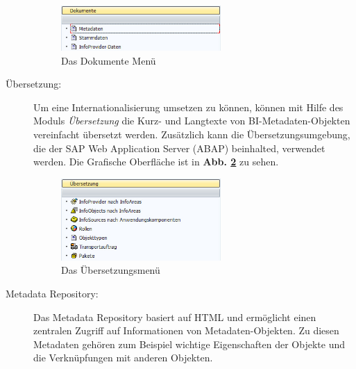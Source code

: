 \begin{description}
\begin{figure}[H]
    \centering
    \includegraphics[width=0.6\textwidth]{files/Dokumente}
    \caption{Das Dokumente Menü}
    \label{pic:Dokumente}
\end{figure}
\item[Übersetzung:] Um eine Internationalisierung umsetzen zu können, können mit Hilfe des Moduls \textit{Übersetzung} die Kurz- und Langtexte von BI-Metadaten-Objekten vereinfacht übersetzt werden. Zusätzlich kann die Übersetzungsumgebung, die der SAP Web Application Server (ABAP) beinhalted, verwendet werden.
Die Grafische Oberfläche ist in \textbf{Abb. \ref{pic:Uebersetzung}} zu sehen.
\begin{figure}[H]
    \centering
    \includegraphics[width=0.6\textwidth]{files/Uebersetzung}
    \caption{Das Übersetzungsmenü}
    \label{pic:Uebersetzung}
\end{figure}
\item[Metadata Repository:] Das Metadata Repository basiert auf HTML und ermöglicht einen zentralen Zugriff auf Informationen von Metadaten-Objekten. Zu diesen Metadaten gehören zum Beispiel wichtige Eigenschaften der Objekte und die Verknüpfungen mit anderen Objekten.
\end{description}




